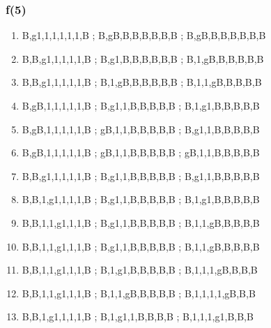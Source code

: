 \documentclass[leqno]{article}
\begin{document}
            \subsubsection{f(5)}
                \begin{enumerate} 
                    \item {}                {B,g1,1,1,1,1,1,B ; B,gB,B,B,B,B,B,B ; B,gB,B,B,B,B,B,B}
                    \item {}                {B,B,g1,1,1,1,1,B ; B,g1,B,B,B,B,B,B ; B,1,gB,B,B,B,B,B}
                    \item {}              {B,B,g1,1,1,1,1,B ; B,1,gB,B,B,B,B,B ; B,1,1,gB,B,B,B,B}
                    \item {}              {B,gB,1,1,1,1,1,B ; B,g1,1,B,B,B,B,B ; B,1,g1,B,B,B,B,B}
                    \item {}             {B,gB,1,1,1,1,1,B ; gB,1,1,B,B,B,B,B ; B,g1,1,B,B,B,B,B}
                    \item {}            {B,gB,1,1,1,1,1,B ; gB,1,1,B,B,B,B,B ; gB,1,1,B,B,B,B,B}
                    \item {}               {B,B,g1,1,1,1,1,B ; B,g1,1,B,B,B,B,B ; B,g1,1,B,B,B,B,B}
                    \item {}               {B,B,1,g1,1,1,1,B ; B,g1,1,B,B,B,B,B ; B,1,g1,B,B,B,B,B}
                    \item {}              {B,B,1,1,g1,1,1,B ; B,g1,1,B,B,B,B,B ; B,1,1,gB,B,B,B,B}
                    \item {}              {B,B,1,1,g1,1,1,B ; B,g1,1,B,B,B,B,B ; B,1,1,gB,B,B,B,B}
                    \item {}          {B,B,1,1,g1,1,1,B ; B,1,g1,B,B,B,B,B ; B,1,1,1,gB,B,B,B}
                    \item {}        {B,B,1,1,g1,1,1,B ; B,1,1,gB,B,B,B,B ; B,1,1,1,1,gB,B,B}
                    \item {}         {B,B,1,g1,1,1,1,B ; B,1,g1,1,B,B,B,B ; B,1,1,1,g1,B,B,B}

\end{enumerate}
\end{document}
